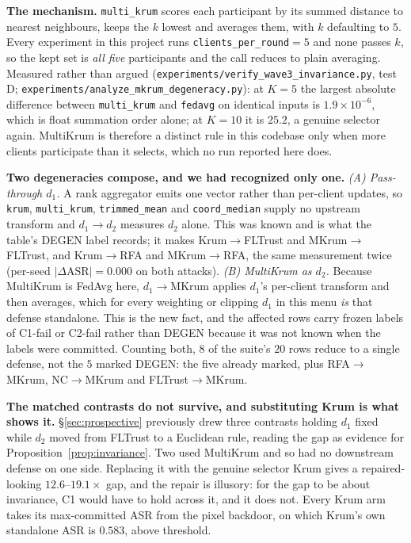 \documentclass{article}
\begin{document}
\textbf{The mechanism.} \texttt{multi\_krum} scores each participant by its summed distance to nearest neighbours, keeps the $k$ lowest and averages them, with $k$ defaulting to $5$. Every experiment in this project runs \texttt{clients\_per\_round}${}={}5$ and none passes $k$, so the kept set is \emph{all five} participants and the call reduces to plain averaging. Measured rather than argued (\texttt{experiments/verify\_wave3\_invariance.py}, test D; \texttt{experiments/analyze\_mkrum\_degeneracy.py}): at $K{=}5$ the largest absolute difference between \texttt{multi\_krum} and \texttt{fedavg} on identical inputs is $1.9\times10^{-6}$, which is float summation order alone; at $K{=}10$ it is $25.2$, a genuine selector again. MultiKrum is therefore a distinct rule in this codebase only when more clients participate than it selects, which no run reported here does.

\textbf{Two degeneracies compose, and we had recognized only one.} \emph{(A) Pass-through $d_1$.} A rank aggregator emits one vector rather than per-client updates, so \texttt{krum}, \texttt{multi\_krum}, \texttt{trimmed\_mean} and \texttt{coord\_median} supply no upstream transform and $d_1{\to}d_2$ measures $d_2$ alone. This was known and is what the table's DEGEN label records; it makes Krum$\to$FLTrust and MKrum$\to$FLTrust, and Krum$\to$RFA and MKrum$\to$RFA, the same measurement twice (per-seed $|\Delta\mathrm{ASR}| = 0.000$ on both attacks). \emph{(B) MultiKrum as $d_2$.} Because MultiKrum is FedAvg here, $d_1{\to}$MKrum applies $d_1$'s per-client transform and then averages, which for every weighting or clipping $d_1$ in this menu \emph{is} that defense standalone. This is the new fact, and the affected rows carry frozen labels of C1-fail or C2-fail rather than DEGEN because it was not known when the labels were committed. Counting both, $8$ of the suite's $20$ rows reduce to a single defense, not the $5$ marked DEGEN: the five already marked, plus RFA$\to$MKrum, NC$\to$MKrum and FLTrust$\to$MKrum.

\textbf{The matched contrasts do not survive, and substituting Krum is what shows it.} §\ref{sec:prospective} previously drew three contrasts holding $d_1$ fixed while $d_2$ moved from FLTrust to a Euclidean rule, reading the gap as evidence for Proposition~\ref{prop:invariance}. Two used MultiKrum and so had no downstream defense on one side. Replacing it with the genuine selector Krum gives a repaired-looking $12.6$--$19.1\times$ gap, and the repair is illusory: for the gap to be about invariance, C1 would have to hold across it, and it does not. Every Krum arm takes its max-committed ASR from the pixel backdoor, on which Krum's own standalone ASR is $0.583$, above threshold.
\end{document}
